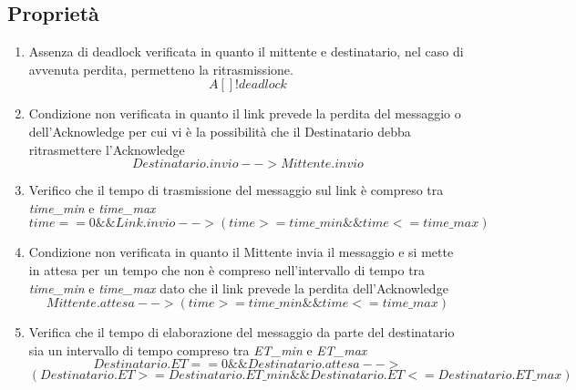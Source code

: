 \documentclass{article}
\begin{document}
\subsection{Proprietà}
\begin{enumerate}
    \item Assenza di deadlock verificata in quanto il mittente e destinatario, nel caso di avvenuta perdita, permetteno la ritrasmissione.
    \begin{equation}
    A[ ] !deadlock
    \end{equation}
\item  Condizione non verificata in quanto il link prevede la perdita del messaggio o dell'Acknowledge per cui vi è la possibilità che il Destinatario debba ritrasmettere l'Acknowledge 
\begin{equation}
Destinatario.invio --> Mittente.invio 
\end{equation}
 \item Verifico che il tempo di trasmissione del messaggio sul link è compreso tra \textit{time\_min} e \textit{time\_max}
\begin{equation}
    time == 0 \&\& Link.invio --> (time >= time\_min \&\& time <= time\_max)
\end{equation}
\item Condizione non verificata in quanto il Mittente invia il messaggio e si mette in attesa per un tempo che non è compreso nell'intervallo di tempo tra \textit{time\_min} e \textit{time\_max} dato che il link prevede la perdita dell'Acknowledge 
\begin{equation}
Mittente.attesa --> (time >= time\_min  \&\& time <= time\_max)
\end{equation}
\item Verifica che il tempo di elaborazione del messaggio da parte del destinatario sia un intervallo di tempo compreso tra \textit{ET\_min} e \textit{ET\_max}
\begin{equation}
    Destinatario.ET == 0 \&\& Destinatario.attesa --> 
    \end{equation}
    \begin{equation}
        (Destinatario.ET >= 
    Destinatario.ET\_min \&\& Destinatario.ET <= Destinatario.ET\_max)
 \end{equation}
\end{enumerate}
\clearpage
\end{document}
